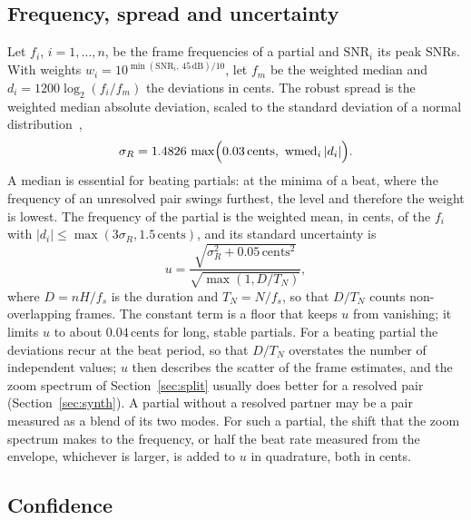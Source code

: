 \documentclass[10pt,a4paper,twocolumn]{article}
\newcommand{\ct}{\,\mathrm{cents}}
\begin{document}
\subsection{Frequency, spread and uncertainty}

Let $f_i$, $i = 1,\dots,n$, be the frame frequencies of a partial and $\mathrm{SNR}_i$ its peak SNRs. With weights $w_i = 10^{\min(\mathrm{SNR}_i,\,45\,\mathrm{dB})/10}$, let $f_m$ be the weighted median and $d_i = 1200\log_2(f_i/f_m)$ the deviations in cents. The robust spread is the weighted median absolute deviation, scaled to the standard deviation of a normal distribution~\cite{Rousseeuw},
\begin{equation}
\sigma_R = 1.4826\, \max\Bigl(0.03\ct,\ \operatorname{wmed}_i |d_i|\Bigr).
\end{equation}
A median is essential for beating partials: at the minima of a beat, where the frequency of an unresolved pair swings furthest, the level and therefore the weight is lowest. The frequency of the partial is the weighted mean, in cents, of the $f_i$ with $|d_i| \le \max(3\sigma_R, 1.5\ct)$, and its standard uncertainty is
\begin{equation}
u = \frac{\sqrt{\sigma_R^2 + 0.05\ct^2}}{\sqrt{\max(1, D/T_N)}},
\label{eq:unc}
\end{equation}
where $D = nH/f_s$ is the duration and $T_N = N/f_s$, so that $D/T_N$ counts non-overlapping frames. The constant term is a floor that keeps $u$ from vanishing; it limits $u$ to about $0.04\ct$ for long, stable partials. For a beating partial the deviations recur at the beat period, so that $D/T_N$ overstates the number of independent values; $u$ then describes the scatter of the frame estimates, and the zoom spectrum of Section~\ref{sec:split} usually does better for a resolved pair (Section~\ref{sec:synth}). A partial without a resolved partner may be a pair measured as a blend of its two modes. For such a partial, the shift that the zoom spectrum makes to the frequency, or half the beat rate measured from the envelope, whichever is larger, is added to $u$ in quadrature, both in cents.

\subsection{Confidence}
\label{sec:conf}
\end{document}
